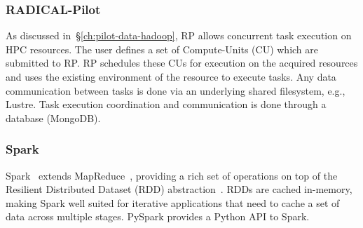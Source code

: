 \subsubsection*{RADICAL-Pilot}


As discussed in~\S\ref{ch:pilot-data-hadoop}, RP allows concurrent
task execution on HPC resources. The user defines a set of Compute-Units (CU)
which are submitted to RP. RP schedules these CUs for
execution on the acquired resources and uses the existing environment of the
resource to execute tasks. Any data communication between tasks is done via an
underlying shared filesystem, e.g., Lustre. Task execution coordination and
communication is done through a database (MongoDB).


\subsubsection*{Spark}

Spark~\cite{zaharia2010spark} extends MapReduce~\cite{dean2004mapreduce},
providing a rich set of operations on top of the Resilient Distributed Dataset
(RDD) abstraction~\cite{zaharia2012resilient}. RDDs are cached in-memory, making
Spark well suited for iterative applications that need to cache a set of data
across multiple stages. PySpark provides a Python API to Spark.

